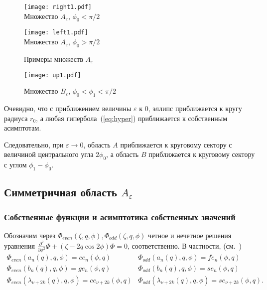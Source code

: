 \begin{figure}[ht]
    \begin{minipage}[b][][b]{0.49\linewidth}\centering
        \texttt{[image: right1.pdf]} \\ 
        Множество $A_\varepsilon$, $\phi_0<\pi/2$
    \end{minipage}
    \hfill
    \begin{minipage}[b][][b]{0.49\linewidth}\centering
        \texttt{[image: left1.pdf]} \\ 
        Множество $A_\varepsilon$, $\phi_0>\pi/2$
    \end{minipage}
\caption{Примеры множеств $A_\varepsilon$}
\end{figure}

\begin{figure}[ht]
\begin{minipage}{0.9\linewidth}\centering
        \texttt{[image: up1.pdf]}  
    \end{minipage}
\caption{        Множество $B_\varepsilon$, $\phi_0<\phi_1<\pi/2$}
\end{figure}

Очевидно, что с приближением величины $\varepsilon$ к 0, эллипс приближается к кругу радиуса $r_0$,
а любая гипербола~(\ref{eq:hyper}) приближается к собственным асимптотам.

Следовательно, при $\varepsilon\to 0$, область $A$ приближается к круговому сектору с величиной центрального угла $2\phi_0$, 
а область  $B$ приближается к круговому сектору с углом $\phi_1-\phi_0$. 


\subsection{Симметричная область $A_\varepsilon$}\label{sec:ch2/sec2/sub2}
\subsubsection{Собственные функции и асимптотика собственных значений}\label{sec:ch2/sec2/sub2/sub1}

Обозначим через $\Phi_{even}(\zeta, q, \phi), \Phi_{odd}(\zeta, q, \phi)$ четное и нечетное решения уравнения $\frac{\partial^2}{\partial \phi^2}\Phi + (\zeta - 2q\cos{2\phi})\Phi = 0$, соответственно. 
В частности, (см.~\cite{wref2})
\[
\begin{array}{ll}
    \Phi_{even}(a_n(q), q, \phi) = ce_n(\phi, q)	&
    \Phi_{odd}(a_n(q), q, \phi) = fe_n(\phi, q)\\
    \Phi_{even}(b_n(q), q, \phi) = ge_n(\phi, q)	&
    \Phi_{odd}(b_n(q), q, \phi) = se_n(\phi, q)\\
    \Phi_{even}(\lambda_{\nu+2k}(q), q, \phi) = ce_{\nu+2k}(\phi, q) 	&
    \Phi_{odd}(\lambda_{\nu+2k}(q), q, \phi) = se_{\nu+2k}(\phi, q).
\end{array}
\]

